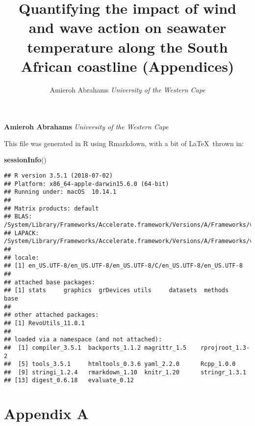 \documentclass[10pt,a4,]{article}
\title{Quantifying the impact of wind and wave action on seawater temperature
along the South African coastline (Appendices)  }
\author{\Large Amieroh Abrahams\vspace{0.05in} \newline\normalsize\emph{University of the Western Cape}  }
\date{}
\newcommand*{\authorfont}{\fontfamily{phv}\selectfont}
\newenvironment{Shaded}{\begin{snugshade}}{\end{snugshade}}
\newcommand{\KeywordTok}[1]{\textcolor[rgb]{0.13,0.29,0.53}{\textbf{#1}}}
\newcommand{\NormalTok}[1]{#1}
\begin{document}

{%
\setlength{\parindent}{0pt}
\thispagestyle{plain}
{\fontsize{18}{20}\selectfont\raggedright
\maketitle  %
}
{
   \vskip 13.5pt\relax \normalsize\fontsize{11}{12}
\textbf{\authorfont Amieroh Abrahams} \hskip 15pt \emph{\small University of the Western Cape}   
}
}



\vskip 6.5pt

\noindent 

This file was generated in R using Rmarkdown, with a bit of
\LaTeX~thrown in:

\begin{Shaded}
\begin{Highlighting}[]
\KeywordTok{sessionInfo}\NormalTok{()}
\end{Highlighting}
\end{Shaded}

\begin{verbatim}
## R version 3.5.1 (2018-07-02)
## Platform: x86_64-apple-darwin15.6.0 (64-bit)
## Running under: macOS  10.14.1
## 
## Matrix products: default
## BLAS: /System/Library/Frameworks/Accelerate.framework/Versions/A/Frameworks/vecLib.framework/Versions/A/libBLAS.dylib
## LAPACK: /System/Library/Frameworks/Accelerate.framework/Versions/A/Frameworks/vecLib.framework/Versions/A/libLAPACK.dylib
## 
## locale:
## [1] en_US.UTF-8/en_US.UTF-8/en_US.UTF-8/C/en_US.UTF-8/en_US.UTF-8
## 
## attached base packages:
## [1] stats     graphics  grDevices utils     datasets  methods   base     
## 
## other attached packages:
## [1] RevoUtils_11.0.1
## 
## loaded via a namespace (and not attached):
##  [1] compiler_3.5.1  backports_1.1.2 magrittr_1.5    rprojroot_1.3-2
##  [5] tools_3.5.1     htmltools_0.3.6 yaml_2.2.0      Rcpp_1.0.0     
##  [9] stringi_1.2.4   rmarkdown_1.10  knitr_1.20      stringr_1.3.1  
## [13] digest_0.6.18   evaluate_0.12
\end{verbatim}

\newpage

\section*{\large{Appendix A}}
\end{document}
